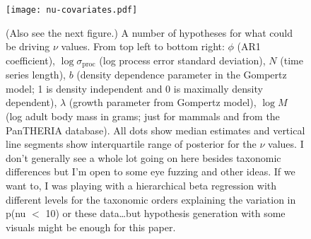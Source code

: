 \documentclass[10pt]{article}
\begin{document}
%



\clearpage

\begin{figure}[htbp]
\begin{center}
\texttt{[image: nu-covariates.pdf]}
\caption{(Also see the next figure.) A number of hypotheses for what could be driving $\nu$ values. From top left to bottom right: $\phi$ (AR1 coefficient), $\log \sigma_\mathrm{proc}$ (log process error standard deviation), $N$ (time series length), $b$ (density dependence parameter in the Gompertz model; 1 is density independent and 0 is maximally density dependent), $\lambda$ (growth parameter from Gompertz model), $\log M$ (log adult body mass in grams; just for mammals and from the PanTHERIA database). All dots show median estimates and vertical line segments show interquartile range of posterior for the $\nu$ values. I don't generally see a whole lot going on here besides taxonomic differences but I'm open to some eye fuzzing and other ideas. If we want to, I was playing with a hierarchical beta regression with different levels for the taxonomic orders explaining the variation in p(nu $<$ 10) or these data\ldots but hypothesis generation with some visuals might be enough for this paper.}
\label{default}
\end{center}
\end{figure}
\end{document}

